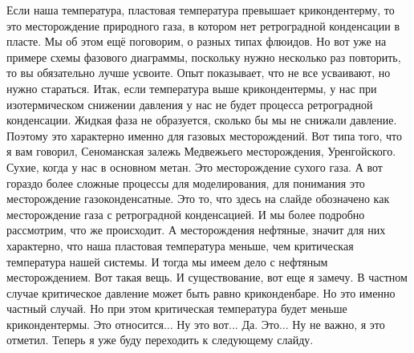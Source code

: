 \documentclass[main.tex]{subfiles}
\begin{document}
Если наша температура, пластовая температура превышает крикондентерму, то это месторождение природного газа, в котором нет ретроградной конденсации в пласте.
Мы об этом ещё поговорим, о разных типах флюидов.
Но вот уже на примере схемы фазового диаграммы, поскольку нужно несколько раз повторить, то вы обязательно лучше усвоите.
Опыт показывает, что не все усваивают, но нужно стараться.
Итак, если температура выше крикондентермы, у нас при изотермическом снижении давления у нас не будет процесса ретроградной конденсации.
Жидкая фаза не образуется, сколько бы мы не снижали
давление.
Поэтому это характерно именно для газовых месторождений.
Вот типа того, что я вам говорил, Сеноманская залежь Медвежьего месторождения, Уренгойского.
Сухие, когда у нас в основном метан.
Это месторождение сухого газа.
А вот гораздо более сложные процессы для моделирования, для понимания это месторождение газоконденсатные.
Это то, что здесь на слайде обозначено как месторождение газа с ретроградной конденсацией.
И мы более подробно рассмотрим, что же происходит.
А месторождения нефтяные, значит для них характерно, что наша пластовая температура меньше, чем критическая температура нашей системы.
И тогда мы имеем дело с нефтяным месторождением.
Вот такая вещь.
И существование, вот еще я замечу.
В частном случае критическое давление может быть равно криконденбаре.
Но это именно частный случай.
Но при этом критическая температура будет меньше крикондентермы.
Это относится...
Ну это вот...
Да.
Это...
Ну не важно, я это отметил.
Теперь я уже буду переходить к следующему слайду.
\end{document}
